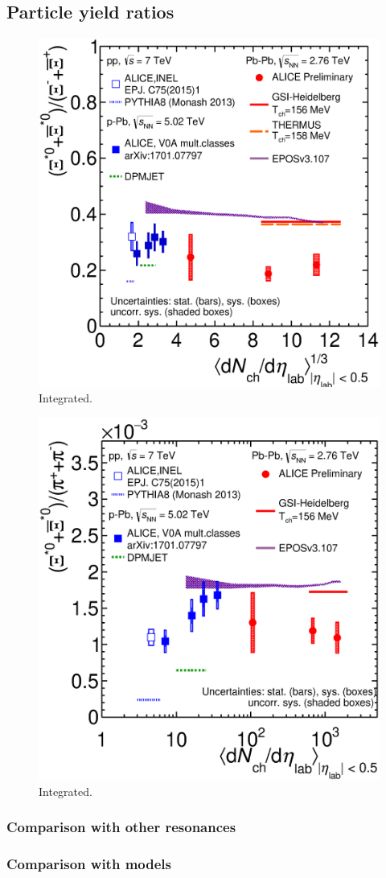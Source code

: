 \subsection{Particle yield ratios}
\begin{figure}[htbp]
\begin{center}
\includegraphics[width=12.cm]{./Version1/FigChapter6/Ratio/Ratio_XiStarToXi}
\caption{Integrated.}
\label{fig:xitoxi}
\end{center}
\end{figure}

\begin{figure}[htbp]
\begin{center}
\includegraphics[width=12.cm]{./Version1/FigChapter6/Ratio/Ratio_XiStarToPion}
\caption{Integrated.}
\label{fig:xitopi}
\end{center}
\end{figure}

\subsubsection{Comparison with other resonances}
\subsubsection{Comparison with models}